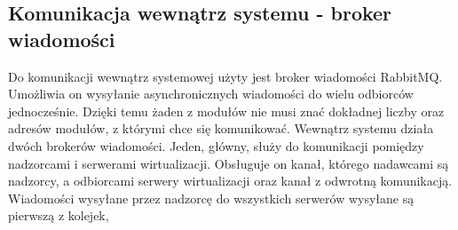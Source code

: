 \documentclass[../../deliverable-two.tex]{subfiles}
\begin{document}
\subsection{Komunikacja wewnątrz systemu - broker wiadomości}

Do komunikacji wewnątrz systemowej użyty jest broker wiadomości RabbitMQ. Umożliwia on wysyłanie asynchronicznych wiadomości do wielu odbiorców jednocześnie. Dzięki temu żaden z modułów nie musi znać dokładnej liczby oraz adresów modułów, z którymi chce się komunikować.
Wewnątrz systemu działa dwóch brokerów wiadomości. Jeden, główny, służy do komunikacji pomiędzy nadzorcami i serwerami wirtualizacji. Obsługuje on kanał, którego nadawcami są nadzorcy, a odbiorcami serwery wirtualizacji oraz kanał z odwrotną komunikacją. Wiadomości wysyłane przez nadzorcę do wszystkich serwerów wysyłane są pierwszą z kolejek,
\end{document}
